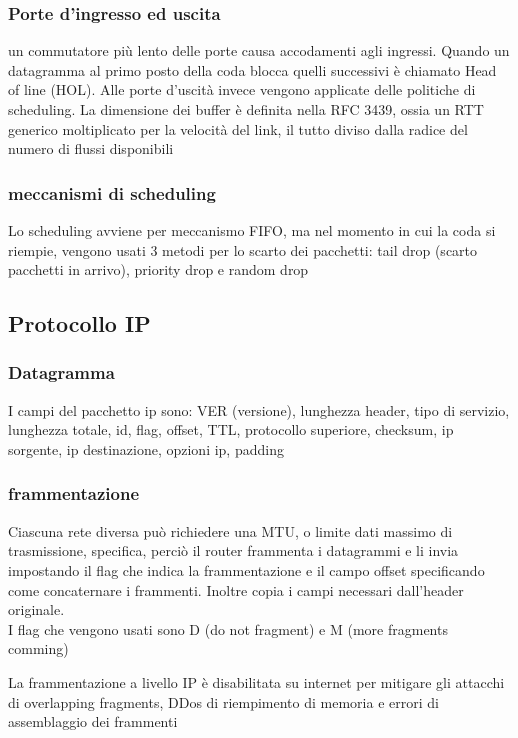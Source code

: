 \documentclass[12pt, a4paper]{article}
\begin{document}
\subsubsection{Porte d'ingresso ed uscita}
un commutatore più lento delle porte causa accodamenti agli ingressi. Quando un datagramma al primo posto 
della coda blocca quelli successivi è chiamato Head of line (HOL). Alle porte d'uscità invece vengono
applicate delle politiche di scheduling. La dimensione dei buffer è definita nella RFC 3439, ossia un RTT
generico moltiplicato per la velocità del link, il tutto diviso dalla radice del numero di flussi disponibili

\subsubsection{meccanismi di scheduling}
Lo scheduling avviene per meccanismo FIFO, ma nel momento in cui la coda si riempie, vengono usati 3 metodi per
lo scarto dei pacchetti: tail drop (scarto pacchetti in arrivo), priority drop e random drop

\subsection{Protocollo IP}
\subsubsection{Datagramma}
I campi del pacchetto ip sono: VER (versione), lunghezza header, tipo di servizio, lunghezza totale, id, flag,
offset, TTL, protocollo superiore, checksum, ip sorgente, ip destinazione, opzioni ip, padding

\subsubsection{frammentazione}
Ciascuna rete diversa può richiedere una MTU, o limite dati massimo di trasmissione, specifica, perciò il router
frammenta i datagrammi e li invia impostando il flag che indica la frammentazione e il campo offset specificando
come concaternare i frammenti. Inoltre copia i campi necessari dall'header originale.\\I flag che vengono usati 
sono D (do not fragment) e M (more fragments comming)

La frammentazione a livello IP è disabilitata su internet per mitigare gli attacchi di overlapping fragments, 
DDos di riempimento di memoria e errori di assemblaggio dei frammenti
\end{document}
